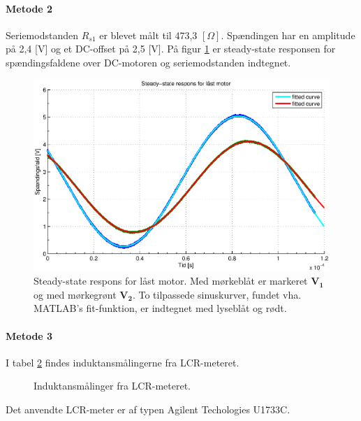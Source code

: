 \paragraph{Metode 2\\}
Seriemodstanden \(R_{s1}\) er blevet målt til 473,3 \([\Omega]\).
Spændingen har en amplitude på 2,4 [V] og et DC-offset på 2,5 [V].
På figur \ref{fig:induktans1} er steady-state responsen for spændingsfaldene over DC-motoren og seriemodstanden indtegnet.
\begin{figure}[th!]
	\centering
	\includegraphics[width=1\textwidth]{./graphics/induktans1.eps}
	\caption[Steady-state respons for låst motor]
		{Steady-state respons for låst motor. Med mørkeblåt er markeret \(\mathbf{V_1}\) og med mørkegrønt \(\mathbf{V_2}\).
		To tilpassede sinuskurver, fundet vha. MATLAB's fit-funktion, er indtegnet med lyseblåt og rødt.}
	\label{fig:induktans1}
\end{figure}

\paragraph{Metode 3\\}
I tabel \ref{tb:lcr} findes induktansmålingerne fra LCR-meteret.
\begin{figure}[th!]
	\centering
	
	\captionsetup{type=table}
	\caption[Induktansmålinger fra LCR-meteret]
			{Induktansmålinger fra LCR-meteret.}
	\label{tb:lcr}
\end{figure}
Det anvendte LCR-meter er af typen Agilent Techologies U1733C.

